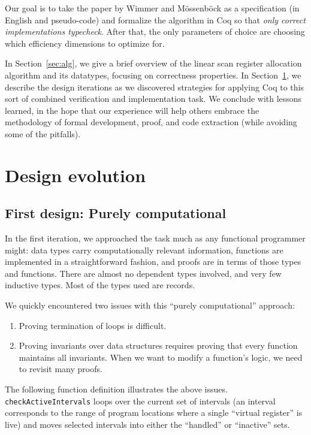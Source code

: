 \documentclass{llncs}
\newif\ifdraft\draftfalse  %
\newcommand{\comment}[3]{\ifdraft\textcolor{#1}{[#2: #3]}\else\fi}
\newcommand{\fixme}[1]{\comment{red}{FIXME}{#1}}
\newcommand{\todo}[1]{\comment{red}{TO DO}{#1}}
\begin{document}
Our goal is to take the paper by Wimmer and M\"{o}ssenb\"{o}ck as a
specification (in English and pseudo-code) and formalize the algorithm in Coq
so that \emph{only correct implementations typecheck}.  After that, the
only parameters of choice are choosing which efficiency dimensions to
optimize for.

\fixme{Rewrite section overview}In Section~\ref{sec:alg}, we give a
brief overview of the linear scan register allocation algorithm and
its datatypes, focusing on correctness properties. In
Section~\ref{sec:evolve}, we describe the design iterations as we
discovered strategies for applying Coq to this sort of combined
verification and implementation task.  We conclude with lessons
learned, in the hope that our experience will help others embrace the
methodology of formal development, proof, and code extraction (while
avoiding some of the pitfalls).

\todo{Add pointer to github repo containing all proofs and extracted
  Haskell (and maybe extended version of this paper).}


\section{Design evolution}
\label{sec:evolve}

\subsection{First design: Purely computational}
\label{sec:compdesign}

In the first iteration, we approached the task much as any functional
programmer might: data types carry computationally relevant
information, functions are implemented in a straightforward fashion,
and proofs are in terms of those types and functions.  There are
almost no dependent types involved, and very few inductive types.
Most of the types used are records.


We quickly encountered two issues with this ``purely computational''
approach:
\begin{enumerate}
\item Proving termination of loops is difficult.
\item Proving invariants over data structures requires proving that
  every function maintains all invariants. When we want to modify a
  function's logic, we need to revisit many proofs.
\end{enumerate}
The following function definition illustrates the above
issues. \texttt{checkActiveIntervals} loops over the current set of
intervals (an interval corresponds to the range of program locations
where a single ``virtual register'' is live) and moves selected
intervals into either the ``handled'' or ``inactive'' sets.
\end{document}
